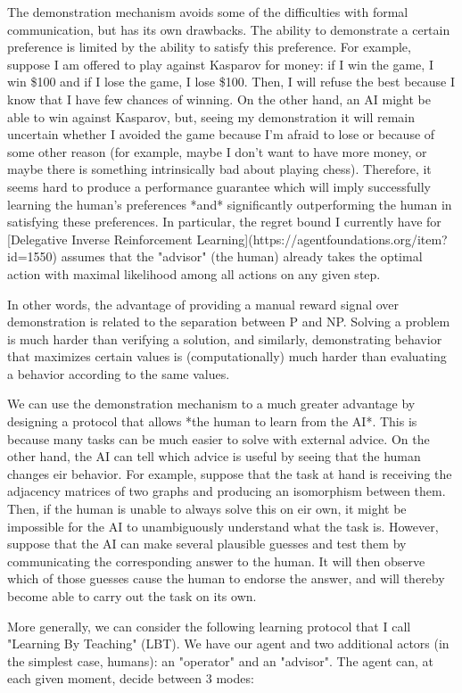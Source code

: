 \documentclass[a4paper]{article}
\begin{document}
The demonstration mechanism avoids some of the difficulties with formal communication, but has its own drawbacks. The ability to demonstrate a certain preference is limited by the ability to satisfy this preference. For example, suppose I am offered to play against Kasparov for money: if I win the game, I win \$100 and if I lose the game, I lose \$100. Then, I will refuse the best because I know that I have few chances of winning. On the other hand, an AI might be able to win against Kasparov, but, seeing my demonstration it will remain uncertain whether I avoided the game because I'm afraid to lose or because of some other reason (for example, maybe I don't want to have more money, or maybe there is something intrinsically bad about playing chess). Therefore, it seems hard to produce a performance guarantee which will imply successfully learning the human's preferences *and* significantly outperforming the human in satisfying these preferences. In particular, the regret bound I currently have for [Delegative Inverse Reinforcement Learning](https://agentfoundations.org/item?id=1550) assumes that the "advisor" (the human) already takes the optimal action with maximal likelihood among all actions on any given step.

In other words, the advantage of providing a manual reward signal over demonstration is related to the separation between P and NP. Solving a problem is much harder than verifying a solution, and similarly, demonstrating behavior that maximizes certain values is (computationally) much harder than evaluating a behavior according to the same values.

We can use the demonstration mechanism to a much greater advantage by designing a protocol that allows *the human to learn from the AI*. This is because many tasks can be much easier to solve with external advice. On the other hand, the AI can tell which advice is useful by seeing that the human changes eir behavior. For example, suppose that the task at hand is receiving the adjacency matrices of two graphs and producing an isomorphism between them. Then, if the human is unable to always solve this on eir own, it might be impossible for the AI to unambiguously understand what the task is. However, suppose that the AI can make several plausible guesses and test them by communicating the corresponding answer to the human. It will then observe which of those guesses cause the human to endorse the answer, and will thereby become able to carry out the task on its own.

More generally, we can consider the following learning protocol that I call "Learning By Teaching" (LBT). We have our agent and two additional actors (in the simplest case, humans): an "operator" and an "advisor". The agent can, at each given moment, decide between 3 modes:
\end{document}
